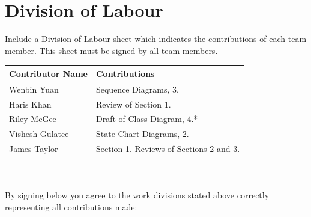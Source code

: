 \documentclass[]{article}
\begin{document}
\newpage

\appendix
\section{Division of Labour}
\label{sec:division_of_labour}
Include a Division of Labour sheet which indicates the contributions of each team member. This sheet must be signed by all team members.


\begin{tabular}{ | l | l | }
\hline
	\textbf{Contributor Name} & \textbf{Contributions}  \\
  	\hline
  	Wenbin Yuan & Sequence Diagrams, 3.\\
  	\hline
  	Haris Khan & Review of Section 1. \\
  	\hline
	Riley McGee & Draft of Class Diagram, 4.* \\
  	\hline
	Vishesh Gulatee & State Chart Diagrams, 2. \\
  	\hline
	James Taylor & Section 1. Reviews of Sections 2 and 3. \\
  	\hline
\end{tabular}
\\
\\
By signing below you agree to the work divisions stated above correctly representing all contributions made:



\newpage
\end{document}
